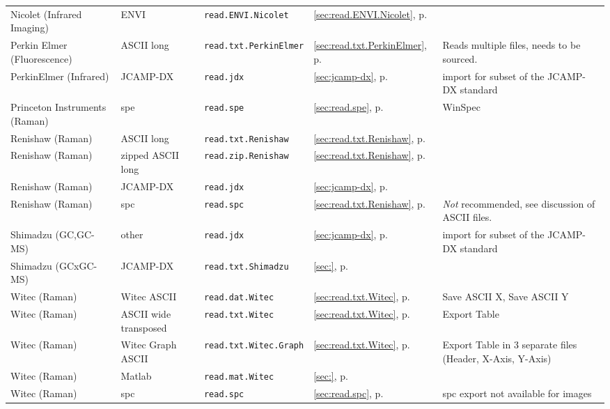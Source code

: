 \documentclass[english, a4paper, 10pt, headings=small, DIV11]{scrartcl}
\newcommand{\Rfunction}[2][]{\texorpdfstring{\nohyphens{#1\texttt{#2}}}{#2}}
\begin{document}
\begin{footnotesize}
\begin{tabular}{@{} l l l l >{\raggedright}p{3.4cm}}
Nicolet (Infrared Imaging)&ENVI & \Rfunction{read.ENVI.Nicolet} & \ref{sec:read.ENVI.Nicolet}, p. \pageref{sec:read.ENVI.Nicolet} & \tabularnewline
Perkin Elmer (Fluorescence)&ASCII long & \Rfunction{read.txt.PerkinElmer} & \ref{sec:read.txt.PerkinElmer}, p. \pageref{sec:read.txt.PerkinElmer} & Reads multiple files, needs to be sourced.\tabularnewline
PerkinElmer (Infrared)&JCAMP-DX & \Rfunction{read.jdx} & \ref{sec:jcamp-dx}, p. \pageref{sec:jcamp-dx} & import for subset of the JCAMP-DX standard\tabularnewline
Princeton Instruments (Raman)&spe & \Rfunction{read.spe} & \ref{sec:read.spe}, p. \pageref{sec:read.spe} & WinSpec\tabularnewline
Renishaw (Raman)&ASCII long & \Rfunction{read.txt.Renishaw} & \ref{sec:read.txt.Renishaw}, p. \pageref{sec:read.txt.Renishaw} & \tabularnewline
Renishaw (Raman)&zipped ASCII long & \Rfunction{read.zip.Renishaw} & \ref{sec:read.txt.Renishaw}, p. \pageref{sec:read.txt.Renishaw} & \tabularnewline
Renishaw (Raman)&JCAMP-DX & \Rfunction{read.jdx} & \ref{sec:jcamp-dx}, p. \pageref{sec:jcamp-dx} & \tabularnewline
Renishaw (Raman)&spc & \Rfunction{read.spc} & \ref{sec:read.txt.Renishaw}, p. \pageref{sec:read.txt.Renishaw} & \emph{Not} recommended, see discussion of ASCII files.\tabularnewline
Shimadzu (GC,GC-MS)&other & \Rfunction{read.jdx} & \ref{sec:jcamp-dx}, p. \pageref{sec:jcamp-dx} & import for  subset of the JCAMP-DX standard\tabularnewline
Shimadzu (GCxGC-MS)&JCAMP-DX & \Rfunction{read.txt.Shimadzu} & \ref{sec:}, p. \pageref{sec:} & \tabularnewline
Witec (Raman)&Witec ASCII & \Rfunction{read.dat.Witec} & \ref{sec:read.txt.Witec}, p. \pageref{sec:read.txt.Witec} & Save ASCII X, Save ASCII Y\tabularnewline
Witec (Raman)&ASCII wide transposed & \Rfunction{read.txt.Witec} & \ref{sec:read.txt.Witec}, p. \pageref{sec:read.txt.Witec} & Export Table\tabularnewline
Witec (Raman)&Witec Graph ASCII & \Rfunction{read.txt.Witec.Graph} & \ref{sec:read.txt.Witec}, p. \pageref{sec:read.txt.Witec} & Export Table in 3 separate files (Header, X-Axis, Y-Axis)\tabularnewline
Witec (Raman)&Matlab & \Rfunction{read.mat.Witec} & \ref{sec:}, p. \pageref{sec:} & \tabularnewline
Witec (Raman)&spc & \Rfunction{read.spc} & \ref{sec:read.spc}, p. \pageref{sec:read.spc} & spc export not available for images\tabularnewline\end{tabular}
\end{footnotesize}
\end{document}

